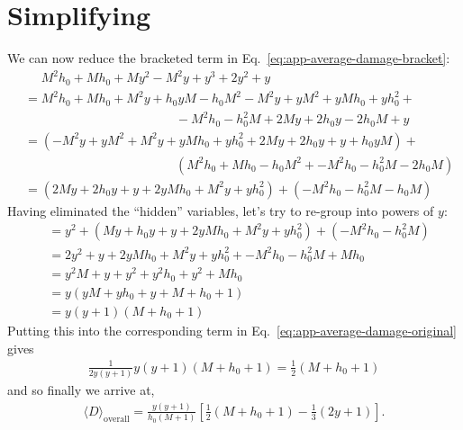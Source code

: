\section{Simplifying}
	We can now reduce the bracketed term in Eq.~\ref{eq:app-average-damage-bracket}:
	\begin{align}
	 	&\phantom{=}M^2h_0+Mh_0+My^2                   -M^2y + y^3                                    +2y^2+y \\
	 	&=M^{2}h_{0}+Mh_{0}+M^{2}y+h_{0}yM-h_{0}M^{2}-M^{2}y+yM^{2}+yMh_{0}+yh_{0}^{2}+\\
	 		&\phantom{=========} -M^{2}h_{0}-h_{0}^{2}M+2My+2h_{0}y-2h_{0}M+y\\
	 	&=\left(-M^{2}y+yM^{2}+M^{2}y+yMh_{0}+yh_{0}^{2}+2My+2h_{0}y+y+h_{0}yM\right)+\\
	 		&\phantom{=========} \left(M^{2}h_{0}+Mh_{0}-h_{0}M^{2}+-M^{2}h_{0}-h_{0}^{2}M-2h_{0}M\right)\\
	 	&=\left(2My+2h_{0}y+y+2yMh_{0}+M^{2}y+yh_{0}^{2}\right)+\left(-M^{2}h_{0}-h_{0}^{2}M-h_{0}M\right)
	\end{align}
	Having eliminated the ``hidden'' variables, let's try to re-group into powers of $y$:
	\begin{align}
	 	&=y^{2}+\left(My+h_{0}y+y+2yMh_{0}+M^{2}y+yh_{0}^{2}\right)+\left(-M^{2}h_{0}-h_{0}^{2}M\right)\\
	 	&=2y^{2}+y+2yMh_{0}+M^{2}y+yh_{0}^{2}+-M^{2}h_{0}-h_{0}^{2}M+Mh_{0}\\
	 	&=y^{2}M+y+y^{2}+y^{2}h_{0}+y^{2}+Mh_{0}\\
	 	&=y\left(yM+yh_{0}+y+M+h_{0}+1\right)\\
	 	&=y\left(y+1\right)\left(M+h_{0}+1\right)
	\end{align}
	Putting this into the corresponding term in Eq.~\ref{eq:app-average-damage-original} gives
	\begin{align}
		\frac{1}{2y(y+1)}y(y+1)\left(M+h_{0}+1\right) = \frac{1}{2}\left(M+h_{0}+1\right)
	\end{align}
	and so finally we arrive at,
	\begin{align}
		\boxed{\langle D \rangle_\text{overall} = \frac{y(y+1)}{h_0({M+1})}\left[
			 \frac{1}{2}\left(M+h_{0} + 1\right) -\frac{1}{3}(2y+1)
		\right]}.
	\end{align}